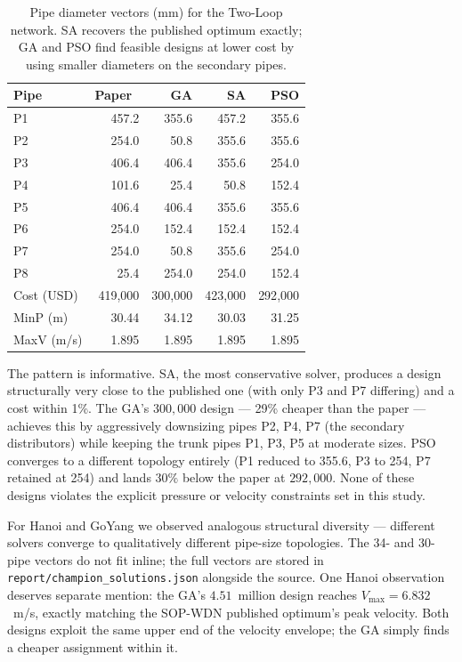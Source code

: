 \documentclass[conference]{IEEEtran}
\begin{document}
\begin{table}[t]
\caption{Pipe diameter vectors (mm) for the Two-Loop network. SA recovers the published optimum exactly; GA and PSO find feasible designs at lower cost by using smaller diameters on the secondary pipes.}
\label{tab:twoloop_champions}
\centering
\begin{tabular}{lrrrr}
\toprule
Pipe & Paper~\cite{sangroula2022} & GA & SA & PSO \\
\midrule
P1 & 457.2 & 355.6 & 457.2 & 355.6 \\
P2 & 254.0 &  50.8 & 355.6 & 355.6 \\
P3 & 406.4 & 406.4 & 355.6 & 254.0 \\
P4 & 101.6 &  25.4 &  50.8 & 152.4 \\
P5 & 406.4 & 406.4 & 355.6 & 355.6 \\
P6 & 254.0 & 152.4 & 152.4 & 152.4 \\
P7 & 254.0 &  50.8 & 355.6 & 254.0 \\
P8 &  25.4 & 254.0 & 254.0 & 152.4 \\
\midrule
Cost (USD)        & 419{,}000 & 300{,}000 & 423{,}000 & 292{,}000 \\
MinP (m)          & 30.44     & 34.12     & 30.03     & 31.25 \\
MaxV (m/s)        & 1.895     & 1.895     & 1.895     & 1.895 \\
\bottomrule
\end{tabular}
\end{table}

The pattern is informative. SA, the most conservative solver, produces a design structurally very close to the published one (with only P3 and P7 differing) and a cost within 1\%. The GA's $300{,}000$ design --- 29\% cheaper than the paper --- achieves this by aggressively downsizing pipes P2, P4, P7 (the secondary distributors) while keeping the trunk pipes P1, P3, P5 at moderate sizes. PSO converges to a different topology entirely (P1 reduced to 355.6, P3 to 254, P7 retained at 254) and lands $30\%$ below the paper at $292{,}000$. None of these designs violates the explicit pressure or velocity constraints set in this study.

For Hanoi and GoYang we observed analogous structural diversity --- different solvers converge to qualitatively different pipe-size topologies. The 34- and 30-pipe vectors do not fit inline; the full vectors are stored in \texttt{report/champion\_solutions.json} alongside the source. One Hanoi observation deserves separate mention: the GA's $4.51$~million design reaches $V_{\max}=6.832$~m/s, exactly matching the SOP-WDN published optimum's peak velocity. Both designs exploit the same upper end of the velocity envelope; the GA simply finds a cheaper assignment within it.
\end{document}
